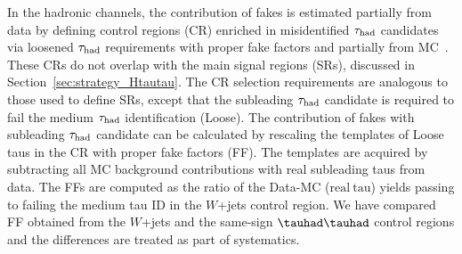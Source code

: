 In the hadronic channels, the contribution of fakes is estimated partially from data by defining control regions (CR)
enriched in misidentified
$\tau_{\mathrm{had}}$ candidates via loosened $\tau_{\mathrm{had}}$ requirements with proper fake factors and partially from MC~\cite{ATLAS-CONF-2021-044}.
These CRs do not overlap with the main signal regions (SRs), discussed in Section~\ref{sec:strategy_Htautau}.
The CR selection requirements are analogous to those used to define SRs, except
that the subleading $\tau_{\mathrm{had}}$ candidate is required to fail the medium $\tau_{\mathrm{had}}$ identification (Loose).
The contribution of fakes with subleading $\tau_{\mathrm{had}}$ candidate can be calculated by rescaling the templates of Loose taus in the CR
with proper fake factors (FF).
The templates are acquired by subtracting all MC background contributions with real subleading taus from data.
The FFs are computed as
the ratio of the Data-MC ($\mathrm{real~tau}$) yields passing to failing the medium tau ID in the $W$+jets control region. We have compared
FF obtained from the $W$+jets and the same-sign $\thadhad$ control regions and the differences are treated as part of systematics.
